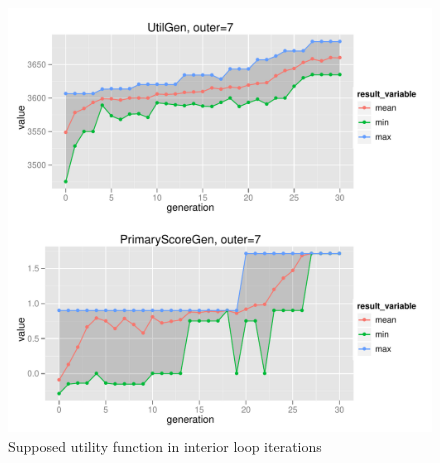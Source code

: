 \begin{figure}
  \centering \includegraphics[width=1.0\textwidth]{exp/nouncert/c2_utilgen_07}
  \caption{Supposed utility function in interior loop iterations}
  \label{c2_utilgen_07}
\end{figure}

